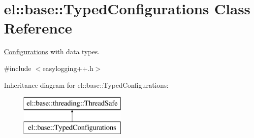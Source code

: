 \hypertarget{classel_1_1base_1_1_typed_configurations}{}\section{el\+:\+:base\+:\+:Typed\+Configurations Class Reference}
\label{classel_1_1base_1_1_typed_configurations}


\hyperlink{classel_1_1_configurations}{Configurations} with data types.  




{\ttfamily \#include $<$easylogging++.\+h$>$}

Inheritance diagram for el\+:\+:base\+:\+:Typed\+Configurations\+:\begin{figure}[H]
\begin{center}
\leavevmode
\includegraphics[height=2.000000cm]{classel_1_1base_1_1_typed_configurations}
\end{center}
\end{figure}
